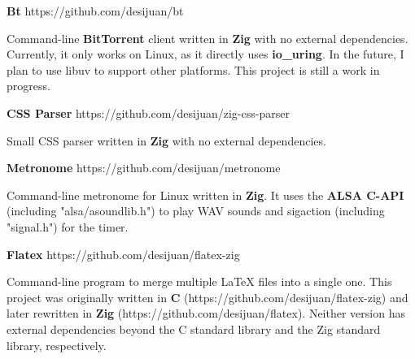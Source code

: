 \documentclass[12pt, a4paper]{article}
\newcommand{\github}{https://github.com/desijuan}
\begin{document}
\begin{multicols*}{2}
\vspace{\espacio}
\textbf{\color{teal}\large Bt} \github/bt\par
Command-line \textbf{BitTorrent} client written in \textbf{Zig} with no external dependencies. Currently, it only works on Linux,
as it directly uses \textbf{io\_uring}. In the future, I plan to use libuv to support other platforms. This project is still
a work in progress.

\vspace{\espacio}
\textbf{\color{teal}\large CSS Parser} \github/zig-css-parser \par
Small CSS parser written in \textbf{Zig} with no external dependencies.

\vspace{\espacio}
\textbf{\color{teal}\large Metronome} \github/metronome \par
Command-line metronome for Linux written in \textbf{Zig}. It uses the \textbf{ALSA C-API} (including "alsa/asoundlib.h")
to play WAV sounds and sigaction (including "signal.h") for the timer.

\vspace{\espacio}
\textbf{\color{teal}\large Flatex} \github/flatex-zig \par
Command-line program to merge multiple LaTeX files into a single one. This project was originally written in \textbf{C} (\github/flatex-zig) and
later rewritten in \textbf{Zig} (\github/flatex). Neither version has external dependencies beyond the C standard library and the Zig standard
library, respectively.

\end{multicols*}
\end{document}
